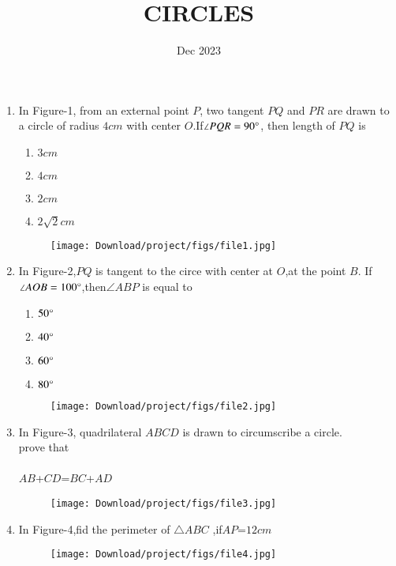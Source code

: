 \documentclass[12pt,-letter paper]{article}
\title{CIRCLES}
\author{}
\date{Dec 2023}
\begin{document}
\maketitle

\begin{enumerate}
\item In Figure-1, from an external point $P$, two tangent $PQ$ and $PR$ are drawn to a circle of radius $4 cm$ with center $O$.If$\angle{PQR}= 90\degree  $,
then length of $PQ$ is \newline
\begin{enumerate}[label=(\alph*)]
\item $3 cm$ 
\item $4 cm$ 
\item $2 cm$
\item $2{\sqrt{2}} cm$ 
\end{enumerate}

 \begin{figure}[H]
\centering
\texttt{[image: Download/project/figs/file1.jpg]}
\caption{}
\label{fig:Figure1}
 \end{figure}
 

 \item In Figure-2,$PQ$ is tangent to the circe with center at $O$,at the point $B$. If$\angle{AOB}=100\degree $,then$\angle{ABP}$ is equal to \newline
\begin{enumerate}[label=(\alph*)] 
\item $50\degree$ 
\item $40\degree$ 
\item $60\degree$ 
\item $80\degree$
\end{enumerate}
		\begin{figure}[H]
	\centering
	\texttt{[image: Download/project/figs/file2.jpg]}
	\caption{}
	\label{fig:figure2}
        \end{figure}
	

\item In Figure-3, quadrilateral $ABCD$ is drawn to circumscribe a circle.\\
prove that\\
\\
$AB$+$CD$=$BC$+$AD$
		\begin{figure}[H]
\centering
\texttt{[image: Download/project/figs/file3.jpg]}
\caption{}
\label{fig:Figure3}
\end{figure}
\item In Figure-4,fid the perimeter of $\triangle ABC $ ,if$AP$=$12 cm$\\

	\begin{figure}[H]
        \centering
        \texttt{[image: Download/project/figs/file4.jpg]}
        \caption{}                                                                                                                            \label{fig:figure4}
        \end{figure}

\end{enumerate}
\end{document}
